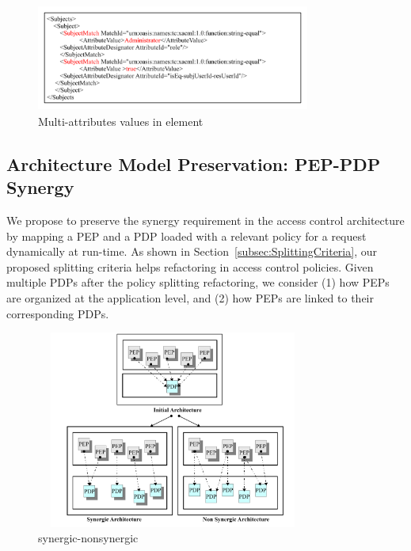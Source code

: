 \begin{figure}[!h]
\begin{center}
\includegraphics[width=9cm, height=3.5cm]{xacml-match}
\caption{Multi-attributes values in  element}
\label{xacml-match}
\end{center}
\end{figure}


\subsection{Architecture Model Preservation: PEP-PDP Synergy}

We propose to preserve the synergy requirement in the access control architecture by mapping a PEP and a PDP loaded
with a relevant policy for a request dynamically at run-time.
As shown in Section~\ref{subsec:SplittingCriteria}, our proposed splitting criteria helps refactoring in access control policies. Given
multiple PDPs after the policy splitting refactoring, we consider (1) how PEPs are organized
at the application level, and (2) how PEPs are linked to their corresponding PDPs.
\begin{figure}[!h]
\begin{center}
\includegraphics[width=9cm, height=6.5cm]{synergic-nonsynergic}
\caption{synergic-nonsynergic}
\label{synergic-nonsynergic}
\end{center}
\end{figure}

